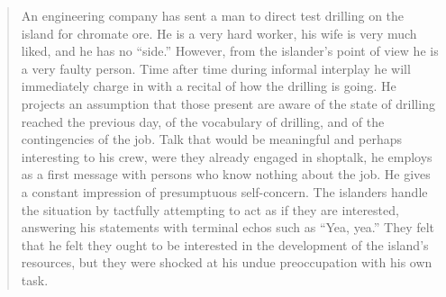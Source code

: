 \documentclass[openany,nobib]{tufte-book}
\begin{document}
\begin{quote}
An engineering company has sent a man to direct test drilling on the
island for chromate ore. He is a very hard worker, his wife is very much
liked, and he has no ``side.'' However, from the islander's point of
view he is a very faulty person. Time after time during informal
interplay he will immediately charge in with a recital of how the
drilling is going. He projects an assumption that those present are
aware of the state of drilling reached the previous day, of the
vocabulary of drilling, and of the contingencies of the job. Talk that
would be meaningful and perhaps interesting to his crew, were they
already engaged in shoptalk, he employs as a first message with persons
who know nothing about the job. He gives a constant impression of
presumptuous self-concern. The islanders handle the situation by
tactfully attempting to act as if they are interested, answering his
statements with terminal echos such as ``Yea, yea.'' They felt that he
felt they ought to be interested in the development of the island's
resources, but they were shocked at his undue preoccupation with his own
task.
\end{quote}
\end{document}
